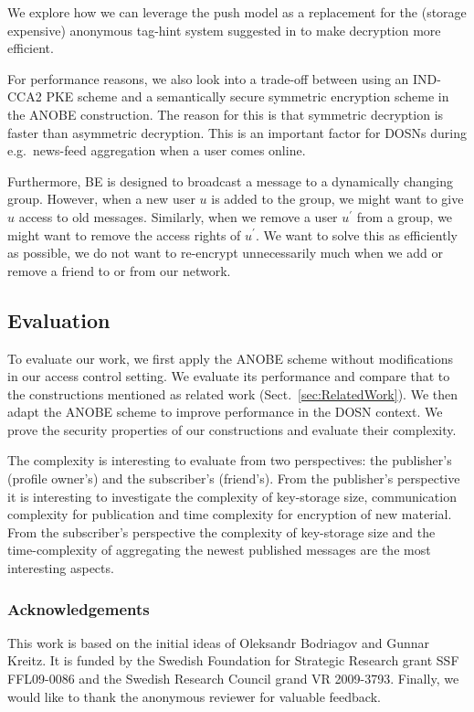 We explore how we can leverage the push model as a replacement for the (storage 
expensive) anonymous tag-hint system suggested in \cite{anobe} to make 
decryption more efficient.

For performance reasons, we also look into a trade-off between using an 
IND-CCA2 \ac{PKE} scheme and a semantically secure symmetric encryption scheme 
in the \ac{ANOBE} construction.
The reason for this is that symmetric decryption is faster than asymmetric 
decryption.
This is an important factor for \acp{DOSN} during e.g.~news-feed aggregation 
when a user comes online.

Furthermore, \ac{BE} is designed to broadcast a message to a dynamically 
changing group.
However, when a new user \(u\) is added to the group, we might want to give 
\(u\) access to old messages.
Similarly, when we remove a user \(u^\prime\) from a group, we might want to 
remove the access rights of \(u^\prime\).
We want to solve this as efficiently as possible, we do not want to re-encrypt 
unnecessarily much when we add or remove a friend to or from our network.

\subsection{Evaluation}\label{sec:Evaluation}

To evaluate our work, we first apply the \ac{ANOBE} scheme without 
modifications in our access control setting.
We evaluate its performance and compare that to the constructions mentioned as 
related work (Sect.~\ref{sec:RelatedWork}).
We then adapt the \ac{ANOBE} scheme to improve performance in the \ac{DOSN} 
context.
We prove the security properties of our constructions and evaluate their 
complexity.

The complexity is interesting to evaluate from two perspectives: the 
publisher's (profile owner's) and the subscriber's (friend's).
From the publisher's perspective it is interesting to investigate the 
complexity of key-storage size, communication complexity for publication and 
time complexity for encryption of new material.
From the subscriber's perspective the complexity of key-storage size and the 
time-complexity of aggregating the newest published messages are the most 
interesting aspects.


\subsubsection{Acknowledgements}

This work is based on the initial ideas of Oleksandr Bodriagov and Gunnar 
Kreitz.
It is funded by the Swedish Foundation for Strategic Research grant SSF 
FFL09-0086 and the Swedish Research Council grand VR 2009-3793.
Finally, we would like to thank the anonymous reviewer for valuable feedback.


\printbibliography
